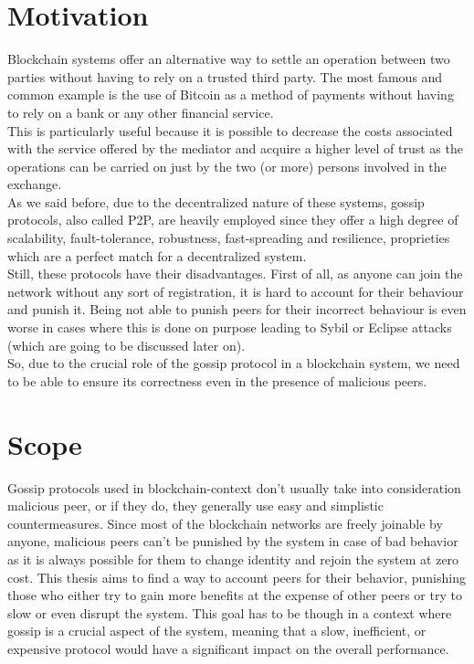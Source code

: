 \documentclass[mscthesis]{usiinfthesis}
\begin{document}
\section{Motivation}
Blockchain systems offer an alternative way to settle an operation between two parties without having to rely on a trusted third party. The most famous and common example is the use of Bitcoin as a method of payments without having to rely on a bank or any other financial service. \\
This is particularly useful because it is possible to decrease the costs associated with the service offered by the mediator and acquire a higher level of trust as the operations can be carried on just by the two (or more) persons involved in the exchange.  \\
As we said before, due to the decentralized nature of these systems, gossip protocols, also called P2P, are heavily employed since they offer a high degree of scalability, fault-tolerance, robustness, fast-spreading and resilience, proprieties which are a perfect match for a decentralized system. \\
Still, these protocols have their disadvantages. First of all, as anyone can join the network without any sort of registration, it is hard to account for their behaviour and punish it. Being not able to punish peers for their incorrect behaviour is even worse in cases where this is done on purpose leading to Sybil\citep{douceur2002sybil} or Eclipse\citep{singh2006eclipse} attacks (which are going to be discussed later on).\\
So, due to the crucial role of the gossip protocol in a blockchain system, we need to be able to ensure its correctness even in the presence of malicious peers.

\section{Scope}
Gossip protocols used in blockchain-context don't usually take into consideration malicious peer, or if they do, they generally use easy and simplistic countermeasures. 
Since most of the blockchain networks are freely joinable by anyone, malicious peers can't be punished by the system in case of bad behavior as it is always possible for them to change identity and rejoin the system at zero cost.
This thesis aims to find a way to account peers for their behavior, punishing those who either try to gain more benefits at the expense
of other peers or try to slow or even disrupt the system. This goal has to be though in a context where gossip is a crucial aspect of the system, meaning that a slow, inefficient, or expensive protocol would have a significant impact on the overall performance.
\end{document}
